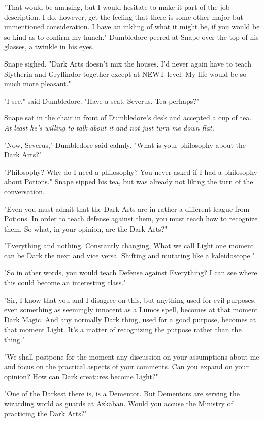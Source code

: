 "That would be amusing, but I would hesitate to make it part of the job description. I do, however, get the feeling that there is some other major but unmentioned consideration. I have an inkling of what it might be, if you would be so kind as to confirm my hunch." Dumbledore peered at Snape over the top of his glasses, a twinkle in his eyes.

Snape sighed. "Dark Arts doesn't mix the houses. I'd never again have to teach Slytherin and Gryffindor together except at NEWT level. My life would be so much more pleasant."

"I see," said Dumbledore. "Have a seat, Severus. Tea perhaps?"

Snape sat in the chair in front of Dumbledore's desk and accepted a cup of tea. \emph{At least he's willing to talk about it and not just turn me down flat.}

"Now, Severus," Dumbledore said calmly. "What is your philosophy about the Dark Arts?"

"Philosophy? Why do I need a philosophy? You never asked if I had a philosophy about Potions." Snape sipped his tea, but was already not liking the turn of the conversation.

"Even you must admit that the Dark Arts are in rather a different league from Potions. In order to teach defense against them, you must teach how to recognize them. So what, in your opinion, are the Dark Arts?"

"Everything and nothing. Constantly changing, What we call Light one moment can be Dark the next and vice versa. Shifting and mutating like a kaleidoscope."

"So in other words, you would teach Defense against Everything? I can see where this could become an interesting class."

"Sir, I know that you and I disagree on this, but anything used for evil purposes, even something as seemingly innocent as a Lumos spell, becomes at that moment Dark Magic. And any normally Dark thing, used for a good purpose, becomes at that moment Light. It's a matter of recognizing the purpose rather than the thing."

"We shall postpone for the moment any discussion on your assumptions about me and focus on the practical aspects of your comments. Can you expand on your opinion? How can Dark creatures become Light?"

"One of the Darkest there is, is a Dementor. But Dementors are serving the wizarding world as guards at Azkaban. Would you accuse the Ministry of practicing the Dark Arts?"

